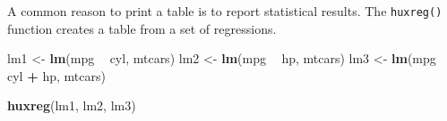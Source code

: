 \documentclass[]{article}
\newenvironment{Shaded}{\begin{snugshade}}{\end{snugshade}}
\newcommand{\KeywordTok}[1]{\textcolor[rgb]{0.13,0.29,0.53}{\textbf{#1}}}
\newcommand{\NormalTok}[1]{#1}
\newcommand{\OperatorTok}[1]{\textcolor[rgb]{0.81,0.36,0.00}{\textbf{#1}}}
\newcommand{\StringTok}[1]{\textcolor[rgb]{0.31,0.60,0.02}{#1}}
\begin{document}
A common reason to print a table is to report statistical results. The
\texttt{huxreg()} function creates a table from a set of regressions.

\begin{Shaded}
\begin{Highlighting}[]
\NormalTok{lm1 <-}\StringTok{ }\KeywordTok{lm}\NormalTok{(mpg }\OperatorTok{~}\StringTok{ }\NormalTok{cyl, mtcars)}
\NormalTok{lm2 <-}\StringTok{ }\KeywordTok{lm}\NormalTok{(mpg }\OperatorTok{~}\StringTok{ }\NormalTok{hp, mtcars)}
\NormalTok{lm3 <-}\StringTok{ }\KeywordTok{lm}\NormalTok{(mpg }\OperatorTok{~}\StringTok{ }\NormalTok{cyl }\OperatorTok{+}\StringTok{ }\NormalTok{hp, mtcars)}

\KeywordTok{huxreg}\NormalTok{(lm1, lm2, lm3)}
\end{Highlighting}
\end{Shaded}

 
  \providecommand{\huxb}[2]{\arrayrulecolor[RGB]{#1}\global\arrayrulewidth=#2pt}
  \providecommand{\huxvb}[2]{\color[RGB]{#1}\vrule width #2pt}
  \providecommand{\huxtpad}[1]{\rule{0pt}{#1}}
  \providecommand{\huxbpad}[1]{\rule[-#1]{0pt}{#1}}
\end{document}
